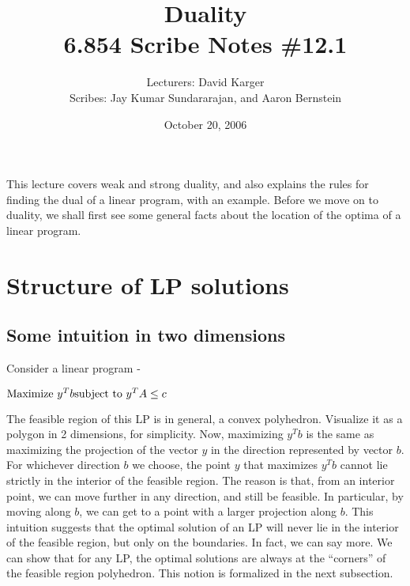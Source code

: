 \documentclass[11pt]{article}
\title{Duality\\ 6.854 Scribe Notes \#12.1}
\date{October 20, 2006}
\author{Lecturers: David Karger\\ Scribes: Jay Kumar Sundararajan, and Aaron Bernstein}
\begin{document}
%
%
%
%

%



This lecture covers weak and strong duality, and also explains the rules for finding the dual of a linear program, with an example. Before we move on to duality, we shall first see some general facts about the location of the optima of a linear program.

\section{Structure of LP solutions}

\subsection{Some intuition in two dimensions}

Consider a linear program - 

$\mbox{Maximize } y^Tb\\ \mbox{subject to } y^TA\leq c$

The feasible region of this LP is in general, a convex polyhedron. Visualize it as a polygon in 2 dimensions, for simplicity. Now, maximizing $y^Tb$ is the same as maximizing the projection of the vector $y$ in the direction represented by vector $b$. For whichever direction $b$ we choose, the point $y$ that maximizes $y^Tb$ cannot lie strictly in the interior of the feasible region. The reason is that, from an interior point, we can move further in any direction, and still be feasible. In particular, by moving along $b$, we can get to a point with a larger projection along $b$. This intuition suggests that the optimal solution of an LP will never lie in the interior of the feasible region, but only on the boundaries. In fact, we can say more. We can show that for any LP, the optimal solutions are always at the ``corners'' of the feasible region polyhedron. This notion is formalized in the next subsection.
\end{document}
